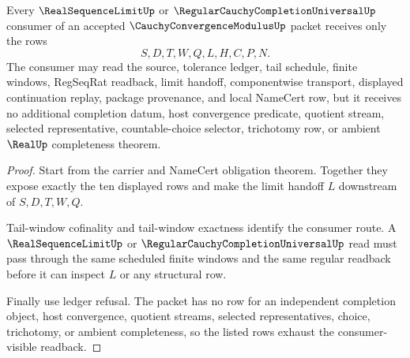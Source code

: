 \begin{theorem}
\label{thm:cauchy-convergence-modulus-limit-readback-exhaustion}
Every $\RealSequenceLimitUp$ or $\RegularCauchyCompletionUniversalUp$ consumer of an accepted $\CauchyConvergenceModulusUp$ packet receives only the rows
$$
S,D,T,W,Q,L,H,C,P,N.
$$
The consumer may read the source, tolerance ledger, tail schedule, finite windows, RegSeqRat readback, limit handoff, componentwise transport, displayed continuation replay, package provenance, and local NameCert row, but it receives no additional completion datum, host convergence predicate, quotient stream, selected representative, countable-choice selector, trichotomy row, or ambient $\RealUp$ completeness theorem.
\end{theorem}
\begin{proof}
Start from the carrier and NameCert obligation theorem. Together they expose exactly the ten displayed rows and make the limit handoff $L$ downstream of $S,D,T,W,Q$.

Tail-window cofinality and tail-window exactness identify the consumer route. A $\RealSequenceLimitUp$ or $\RegularCauchyCompletionUniversalUp$ read must pass through the same scheduled finite windows and the same regular readback before it can inspect $L$ or any structural row.

Finally use ledger refusal. The packet has no row for an independent completion object, host convergence, quotient streams, selected representatives, choice, trichotomy, or ambient completeness, so the listed rows exhaust the consumer-visible readback.
\end{proof}

